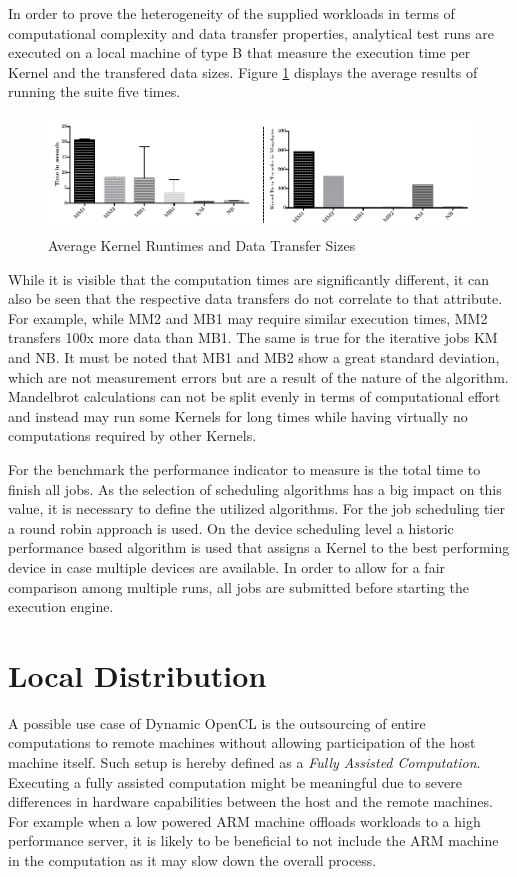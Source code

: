 In order to prove the heterogeneity of the supplied workloads in terms of computational complexity and data transfer properties, analytical test runs are executed on a local machine of type B that measure the execution time per Kernel and the transfered data sizes. Figure \ref{img:benchmark_kernel_attributes} displays the average results of running the suite five times.

\begin{figure}[H]
	
	\includegraphics[width=1.0\textwidth]{images/benchmark_kernel_data_transfers.pdf}
	\centering
	\caption{Average Kernel Runtimes and Data Transfer Sizes}
	\label{img:benchmark_kernel_attributes}
\end{figure}

While it is visible that the computation times are significantly different, it can also be seen that the respective data transfers do not correlate to that attribute. For example, while MM2 and MB1 may require similar execution times, MM2 transfers 100x more data than MB1. The same is true for the iterative jobs KM and NB. It must be noted that MB1 and MB2 show a great standard deviation, which are not measurement errors but are a result of the nature of the algorithm. Mandelbrot calculations can not be split evenly in terms of computational effort and instead may run some Kernels for long times while having virtually no computations required by other Kernels.

For the benchmark the performance indicator to measure is the total time to finish all jobs. As the selection of scheduling algorithms has a big impact on this value, it is necessary to define the utilized algorithms. For the job scheduling tier a round robin approach is used. On the device scheduling level a historic performance based algorithm is used that assigns a Kernel to the best performing device in case multiple devices are available. In order to allow for a fair comparison among multiple runs, all jobs are submitted before starting the execution engine.

\section{Local Distribution}
\label{local_distribution}
A possible use case of Dynamic OpenCL is the outsourcing of entire computations to remote machines without allowing participation of the host machine itself. Such setup is hereby defined as a \textit{Fully Assisted Computation}. Executing a fully assisted computation might be meaningful due to severe differences in hardware capabilities between the host and the remote machines. For example when a low powered ARM machine offloads workloads to a high performance server, it is likely to be beneficial to not include the ARM machine in the computation as it may slow down the overall process.

